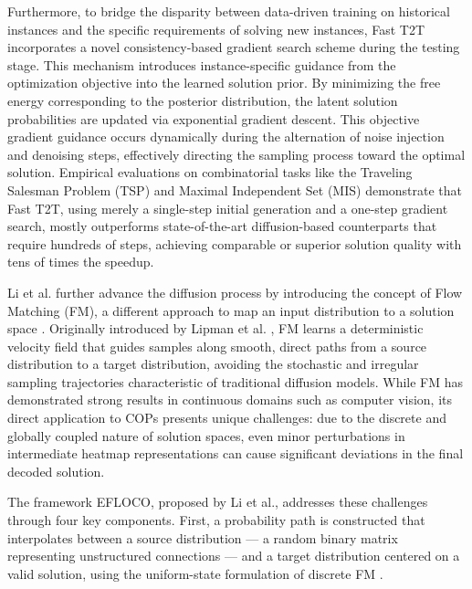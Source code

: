 Furthermore, to bridge the disparity between data-driven training on historical instances and the specific requirements of solving new instances, Fast T2T incorporates a novel consistency-based gradient search scheme during the testing stage. This mechanism introduces instance-specific guidance from the optimization objective into the learned solution prior. By minimizing the free energy corresponding to the posterior distribution, the latent solution probabilities are updated via exponential gradient descent. This objective gradient guidance occurs dynamically during the alternation of noise injection and denoising steps, effectively directing the sampling process toward the optimal solution. Empirical evaluations on combinatorial tasks like the Traveling Salesman Problem (TSP) and Maximal Independent Set (MIS) demonstrate that Fast T2T, using merely a single-step initial generation and a one-step gradient search, mostly outperforms state-of-the-art diffusion-based counterparts that require hundreds of steps, achieving comparable or superior solution quality with tens of times the speedup.

Li et al. further advance the diffusion process by introducing the concept of
Flow Matching (FM), a different approach to map an input distribution to a
solution space \cite{li-26-efloco}. Originally introduced by Lipman et al.
\cite{lipman-22-flow-matching}, FM learns a deterministic velocity field that
guides samples along smooth, direct paths from a source distribution to a
target distribution, avoiding the stochastic and irregular sampling
trajectories characteristic of traditional diffusion models. While FM has
demonstrated strong results in continuous domains such as computer vision, its
direct application to COPs presents unique challenges: due to the discrete and
globally coupled nature of solution spaces, even minor perturbations in
intermediate heatmap representations can cause significant deviations in the
final decoded solution.

The framework EFLOCO, proposed by Li et al., addresses these challenges through
four key components. First, a probability path is constructed that interpolates
between a source distribution --- a random binary matrix representing
unstructured connections --- and a target distribution centered on a valid
solution, using the uniform-state formulation of discrete FM
\cite{shaul-25-discrete-fm}.


